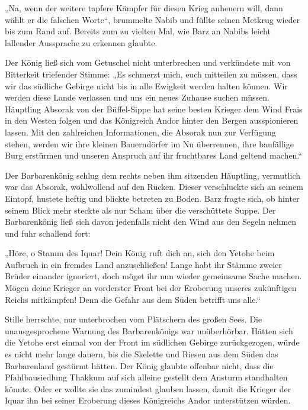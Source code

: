 „Na, wenn der weitere tapfere Kämpfer für diesen Krieg anheuern will, dann wählt er die falschen Worte“, brummelte Nabib und füllte seinen Metkrug wieder bis zum Rand auf. Bereits zum zu vielten Mal, wie Barz an Nabibs leicht lallender Aussprache zu erkennen glaubte.

Der König ließ sich vom Getuschel nicht unterbrechen und verkündete mit von Bitterkeit triefender Stimme: „Es schmerzt mich, euch mitteilen zu müssen, dass wir das südliche Gebirge nicht bis in alle Ewigkeit werden halten können. Wir werden diese Lande verlassen und uns ein neues Zuhause suchen müssen. Häuptling Absorak von der Büffel-Sippe hat seine besten Krieger dem Wind Frais in den Westen folgen und das Königreich Andor hinter den Bergen ausspionieren lassen. Mit den zahlreichen Informationen, die Absorak nun zur Verfügung stehen, werden wir ihre kleinen Bauerndörfer im Nu überrennen, ihre baufällige Burg erstürmen und unseren Anspruch auf ihr fruchtbares Land geltend machen.“

Der Barbarenkönig schlug dem rechts neben ihm sitzenden Häuptling, vermutlich war das Absorak, wohlwollend auf den Rücken. Dieser verschluckte sich an seinem Eintopf, hustete heftig und blickte betreten zu Boden. Barz fragte sich, ob hinter seinem Blick mehr steckte als nur Scham über die verschüttete Suppe. Der Barbarenkönig ließ sich davon jedenfalls nicht den Wind aus den Segeln nehmen und fuhr schallend fort:

„Höre, o Stamm des Iquar! Dein König ruft dich an, sich den Yetohe beim Aufbruch in ein fremdes Land anzuschließen! Lange habt ihr Stämme zweier Brüder einander ignoriert, doch möget ihr nun wieder gemeinsame Sache machen. Mögen deine Krieger an vorderster Front bei der Eroberung unseres zukünftigen Reichs mitkämpfen! Denn die Gefahr aus dem Süden betrifft uns alle.“

Stille herrschte, nur unterbrochen vom Plätschern des großen Sees. Die unausgesprochene Warnung des Barbarenkönigs war unüberhörbar. Hätten sich die Yetohe erst einmal von der Front im südlichen Gebirge zurückgezogen, würde es nicht mehr lange dauern, bis die Skelette und Riesen aus dem Süden das Barbarenland gestürmt hätten. Der König glaubte offenbar nicht, dass die Pfahlbausiedlung Thakkum auf sich alleine gestellt dem Ansturm standhalten könnte. Oder er wollte sie das zumindest glauben lassen, damit die Krieger der Iquar ihn bei seiner Eroberung dieses Königreichs Andor unterstützen würden.

